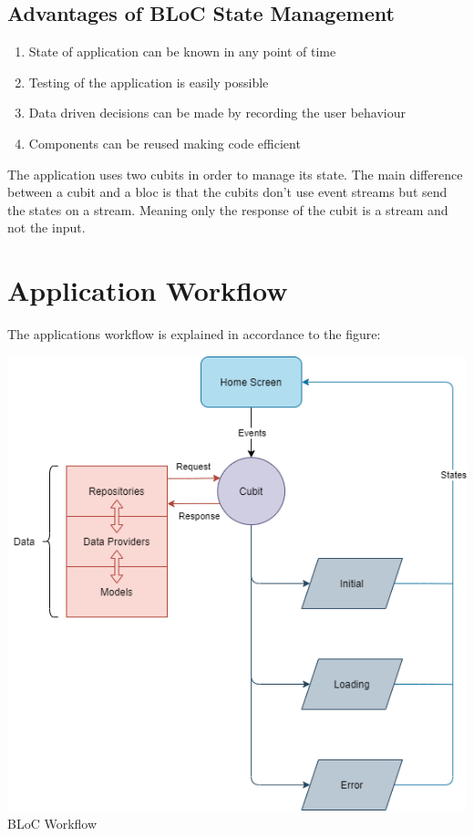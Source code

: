 \documentclass[conference]{IEEEtran}
\newenvironment{Figure}
  {\par\medskip\noindent\minipage{\linewidth}}
  {\endminipage\par\medskip}
\begin{document}
\subsection{Advantages of BLoC State Management}
\begin{enumerate}
  \item State of application can be known in any point of time
  \item Testing of the application is easily possible
  \item Data driven decisions can be made by recording the user behaviour
  \item Components can be reused making code efficient
\end{enumerate}
The application uses two cubits in order to manage its state.
The main difference between a cubit and a bloc is that the cubits
don't use event streams but send the states on a stream. Meaning
only the response of the cubit is a stream and not the input.

\section{Application Workflow}
The applications workflow is explained in accordance to the figure:

\begin{Figure}
  \centering
  \includegraphics[width=\linewidth]{Images/AppWorkflow1.drawio.png}
  \label{App Workflow}
  \figurename{BLoC Workflow}
\end{Figure}
\end{document}
